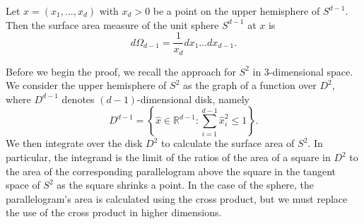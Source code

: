 \documentclass[twoside,11pt]{article}
\newcommand{\R}{{\mathbb R}}
\begin{document}
\begin{lemma}  \label{Lemma:SAofSphere}
Let $x=(x_1, \ldots, x_d)$ with $x_d>0$ be a  point on the upper hemisphere of $S^{d-1}$. Then the surface area  measure of the unit sphere $S^{d-1}$ at $x$ is
				\[d\Omega_{d-1} = \frac{1}{x_d}dx_1 \dots dx_{d-1}.\]
\end{lemma}
Before we begin the proof, we recall the approach for $S^2$ in $3$-dimensional space.  We consider the upper hemisphere of $S^2$ as the graph of a function over $D^2$, where $D^{d-1}$ denotes
 $(d-1)$-dimensional disk, namely
\[ D^{d-1}=\left\lbrace \hat{x} \in \R^{d-1}: \sum_{i=1}^{d-1} \hat{x}_i^2 \leq 1\right\rbrace.\]
We then integrate over the disk $D^2$ to calculate the surface area of $S^2$.  In particular, the integrand is the limit of the ratios of the area of a square in $D^2$ to the area of the corresponding parallelogram above the square in the tangent space of $S^2$ as the square shrinks a point.  In the case of the sphere, the parallelogram's area is calculated using the cross product, but we must replace the use of the cross product in higher dimensions.\medskip
				
\end{document}
